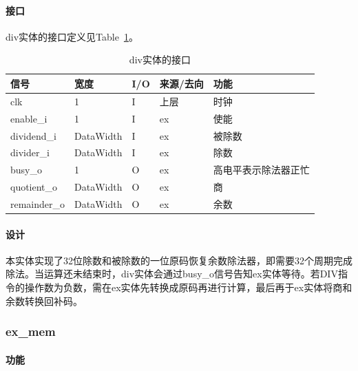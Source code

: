 \documentclass{article}
\begin{document}
\begin{spacing}{1.4}
\paragraph{接口}\mbox{}

div实体的接口定义见Table~\ref{tb:div-interface}。
\begin{table}[!htb]
\begin{center}
\begin{tabular*}{17cm}{l|l|l|l|p{5cm}}
\hline
\textbf{信号}&\textbf{宽度}&\textbf{I/O}&\textbf{来源/去向}&\textbf{功能} \\
\hline clk                     & 1                      & I     & 上层         & 时钟 \\
\hline enable\_i               & 1                      & I     & ex           & 使能 \\
\hline dividend\_i             & DataWidth              & I     & ex           & 被除数 \\
\hline divider\_i              & DataWidth              & I     & ex           & 除数 \\
\hline busy\_o                 & 1                      & O     & ex           & 高电平表示除法器正忙 \\
\hline quotient\_o             & DataWidth              & O     & ex           & 商 \\
\hline remainder\_o            & DataWidth              & O     & ex           & 余数 \\
\hline
\end{tabular*}
\caption{div实体的接口}
\label{tb:div-interface}
\end{center}
\end{table}

\paragraph{设计}\mbox{}

本实体实现了32位除数和被除数的一位原码恢复余数除法器，即需要32个周期完成除法。当运算还未结束时，div实体会通过busy\_o信号告知ex实体等待。若DIV指令的操作数为负数，需在ex实体先转换成原码再进行计算，最后再于ex实体将商和余数转换回补码。

\subsubsection{ex\_mem}

\paragraph{功能}\mbox{}


\end{spacing}
\end{document}
